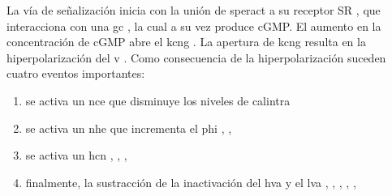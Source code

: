 La vía de señalización inicia con la unión de speract a su receptor \acs{SR} \citeauthor{Darszon2008} \citep{Darszon2008}, que interacciona con una \ac{gc} \citeauthor{Garbers:1976wy} \citep{Garbers:1976wy}, la cual a su vez produce \ac{cGMP}. El aumento en la concentración de \ac{cGMP} abre el \ac{kcng} \citeauthor{Galindo:2007bx} \citep{Galindo:2007bx}. La apertura de \ac{kcng} resulta en la hiperpolarización del \ac{v} \citeauthor{Strunker:2006tk} \citep{Strunker:2006tk}. Como consecuencia de la hiperpolarización suceden cuatro eventos importantes:
\begin{enumerate}
\item se activa un \ac{nce} que disminuye los niveles de \ac{calintra} \citeauthor{Nishigaki:2004p4516} \citep{Nishigaki:2004p4516} 
\item se activa un \ac{nhe} que incrementa el \ac{phi} \citeauthor{Lee:1986vs} \citep{Lee:1986vs} \citeauthor{Wang:2003ke} \citep{Wang:2003ke}, \citeauthor{Su:2002fk} \citep{Su:2002fk}, \citeauthor{Rodriguez:2003do} \citep{Rodriguez:2003do}
\item se activa un \ac{hcn} \citeauthor{Nishigaki:2004p4516} \citep{Nishigaki:2004p4516}, \citeauthor{Rodriguez:2003do} \citep{Rodriguez:2003do}, \citeauthor{Gauss:1998de} \citep{Gauss:1998de}, \citeauthor{Galindo:2005wf} \citep{Galindo:2005wf}
\item finalmente, la sustracción de la inactivación del \ac{hva} y el \ac{lva} \citeauthor{Strunker:2006tk} \citep{Strunker:2006tk}, \citeauthor{GranadosGonzalez:2005ia} \citep{GranadosGonzalez:2005ia}, \citeauthor{Wood:2003p4517} \citep{Wood:2003p4517}, \citeauthor{Wood:2005gg} \citep{Wood:2005gg}, \citeauthor{Darszon:2005tb} \cite{Darszon:2005tb}, \citeauthor{PerezReyes:2003bw} \citep{PerezReyes:2003bw}
\end{enumerate}


